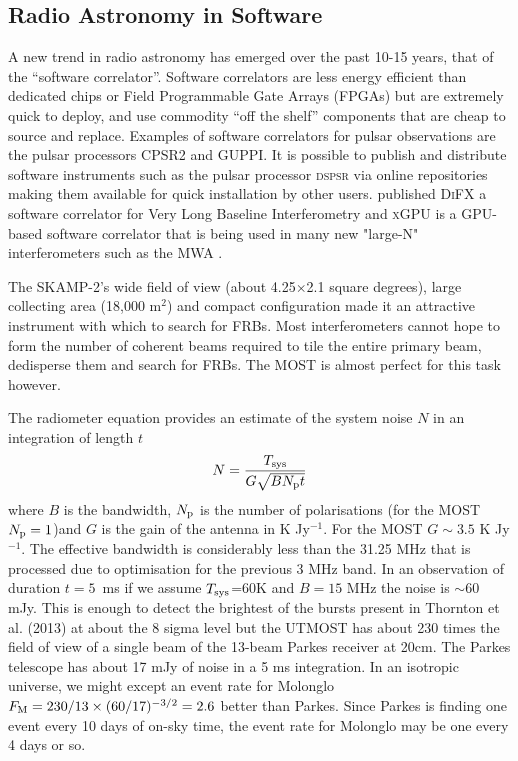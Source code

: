 \subsection{Radio Astronomy in Software}
A new trend in radio astronomy has emerged over the past 10-15 years, that of the ``software correlator''. Software correlators are less energy efficient than dedicated chips or Field Programmable Gate Arrays (FPGAs) but are extremely quick to deploy, and use commodity ``off the shelf'' components that are cheap to source and replace. Examples of software correlators for pulsar observations are the pulsar processors CPSR2 \citep{Bailes_2009} and GUPPI\citep{DuPlain_2008}. It is possible to publish and distribute software instruments such as the pulsar processor \textsc{dspsr} \citep{van_Straten_2011} via online repositories making them available for quick installation by other users. \citep{Deller_2007} published \textsc{DiFX} a software correlator for Very Long Baseline Interferometry and \textsc{xGPU} \citep{Clark_2012} is a GPU-based software correlator that is being used in many new "large-N" interferometers such as the MWA \citep{Tingay_2013}. 

The SKAMP-2's wide field of view (about 4.25$\times$2.1 square degrees), large collecting area (18,000 m$^2$) and compact configuration made it an attractive instrument with which to search for FRBs. Most interferometers cannot hope to form the number of coherent beams required to tile the entire primary beam, dedisperse them and search for FRBs. The MOST is almost perfect for this task however. 

The radiometer equation provides an estimate of the system noise $N$ in an integration of length $t$ 
\begin{equation}
N={{T_{\rm sys}}\over{G\sqrt{BN_{\rm p}t}}}
\end{equation}
\noindent where $B$ is the bandwidth, $N_{\rm p}$ is the number of polarisations (for the MOST $N_{\rm p}=1$)and $G$ is the gain of the antenna in K Jy$^{-1}$. For the MOST $G\sim 3.5$ K Jy$^{-1}$. The effective bandwidth is considerably less than the 31.25 MHz that is processed due to optimisation for the previous 3 MHz band. In an observation of duration $t=5$\, ms if we assume $T_{\rm sys}$=60K and $B=15 $ MHz the noise is $\sim$60 mJy. This is enough to detect the brightest of the bursts present in Thornton et al. (2013) at about the 8 sigma level but the UTMOST has about 230 times the field of view of a single beam of the 13-beam Parkes receiver at 20cm. The Parkes telescope has about 17 mJy of noise in a 5 ms integration. In an isotropic universe, we might except an event rate for Molonglo $F_{\rm M} = 230/13\times(60/17)^{-3/2}=2.6$ better than Parkes. Since Parkes is finding one event every 10 days of on-sky time, the event rate for Molonglo may be one every 4 days or so.

